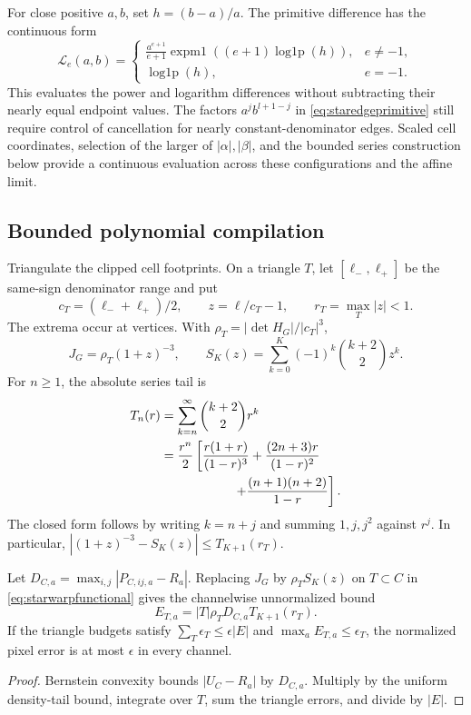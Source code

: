 For close positive $a,b$, set $h=(b-a)/a$. The primitive difference has the
continuous form
\begin{equation}
 \mathcal L_e(a,b)=
 \begin{cases}
 \displaystyle\frac{a^{e+1}}{e+1}
 \operatorname{expm1}((e+1)\operatorname{log1p}(h)),&e\ne-1,\\
 \operatorname{log1p}(h),&e=-1.
 \end{cases}
\end{equation}
This evaluates the power and logarithm differences without subtracting their
nearly equal endpoint values. The factors $a^j b^{l+1-j}$ in
\eqref{eq:staredgeprimitive} still require control of cancellation for nearly
constant-denominator edges. Scaled cell coordinates, selection of the larger
of $|\alpha|,|\beta|$, and the bounded series construction below provide a
continuous evaluation across these configurations and the affine limit.

\subsection{Bounded polynomial compilation}
Triangulate the clipped cell footprints. On a triangle $T$, let
$[\ell_-,\ell_+]$ be the same-sign denominator range and put
\begin{equation}
 c_T=(\ell_-+\ell_+)/2,\qquad z=\ell/c_T-1,\qquad
 r_T=\max_T|z|<1.
\end{equation}
The extrema occur at vertices. With $\rho_T=|\det H_G|/|c_T|^3$,
\begin{equation}
 J_G=\rho_T(1+z)^{-3},\qquad
 S_K(z)=\sum_{k=0}^K(-1)^k\binom{k+2}{2}z^k.
\end{equation}
For $n\geq1$, the absolute series tail is
\begin{align}
 T_n(r)&=\sum_{k=n}^\infty\binom{k+2}{2}r^k\nonumber\\
 &=\frac{r^n}{2}\left[
 \frac{r(1+r)}{(1-r)^3}+\frac{(2n+3)r}{(1-r)^2}\right.\nonumber\\
 &\hspace{20mm}\left.+\frac{(n+1)(n+2)}{1-r}\right].
 \label{eq:starwarptail}
\end{align}
The closed form follows by writing $k=n+j$ and summing $1,j,j^2$ against
$r^j$. In particular, $|(1+z)^{-3}-S_K(z)|\leq T_{K+1}(r_T)$.

\begin{proposition}
Let $D_{C,a}=\max_{i,j}|P_{C,ij,a}-R_a|$. Replacing $J_G$ by
$\rho_TS_K(z)$ on $T\subset C$ in \eqref{eq:starwarpfunctional} gives the
channelwise unnormalized bound
\begin{equation}
 E_{T,a}=|T|\rho_TD_{C,a}T_{K+1}(r_T).
 \label{eq:starwarperror}
\end{equation}
If the triangle budgets satisfy $\sum_T\epsilon_T\leq\epsilon|E|$ and
$\max_a E_{T,a}\leq\epsilon_T$, the normalized pixel error is at most
$\epsilon$ in every channel.
\end{proposition}
\begin{proof}
Bernstein convexity bounds $|U_C-R_a|$ by $D_{C,a}$. Multiply by the uniform
density-tail bound, integrate over $T$, sum the triangle errors, and divide
by $|E|$.
\end{proof}

